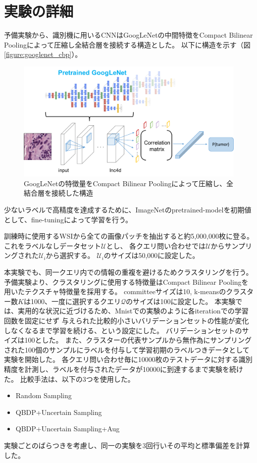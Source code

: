 \section{実験の詳細}
予備実験から、識別機に用いるCNNはGoogLeNetの中間特徴をCompact Bilinear Poolingによって圧縮し全結合層を接続する構造とした。
以下に構造を示す（図\ref{figure:googlenet_cbp}）。
\begin{figure}[tbp]
   \begin{center}
    \includegraphics[width=12cm]{figures/googlenet_cbp.pdf}
   \end{center}
  \caption{\label{fig:googlenet_cbp}GoogLeNetの特徴量をCompact Bilinear Poolingによって圧縮し、全結合層を接続した構造}
\end{figure}
少ないラベルで高精度を達成するために、ImageNetのpretrained-modelを初期値として、fine-tuningによって学習を行う。

訓練時に使用するWSIから全ての画像パッチを抽出すると約5,000,000枚に登る。これをラベルなしデータセット$\mathcal{U}$とし、
各クエリ問い合わせでは$\mathcal{U}$からサンプリングされた$\mathcal{U}_i$から選択する。
$\mathcal{U}_i$のサイズは50,000に設定した。

本実験でも、同一クエリ内での情報の重複を避けるためクラスタリングを行う。
予備実験より、クラスタリングに使用する特徴量はCompact Bilinear Poolingを用いたテクスチャ特徴量を採用する。
committeeサイズは10, k-meansのクラスター数$K$は1000、一度に選択するクエリ$\mathcal{Q}$のサイズは100に設定した。
本実験では、実用的な状況に近づけるため、Mnistでの実験のように各iterationでの学習回数を固定にせず
与えられた比較的小さいバリデーションセットの性能が変化しなくなるまで学習を続ける、という設定にした。
バリデーションセットのサイズは100とした。
また、クラスターの代表サンプルから無作為にサンプリングされた100個のサンプルにラベルを付与して学習初期のラベルつきデータとして実験を開始した。
各クエリ問い合わせ毎に10000枚のテストデータに対する識別精度を計測し、ラベルを付与されたデータが10000に到達するまで実験を続けた。
比較手法は、以下の3つを使用した。
\begin{itemize}
  \item Random Sampling
  \item QBDP+Uncertain Sampling
  \item QBDP+Uncertain Sampling+Aug
\end{itemize}
実験ごとのばらつきを考慮し、同一の実験を3回行いその平均と標準偏差を計算した。

